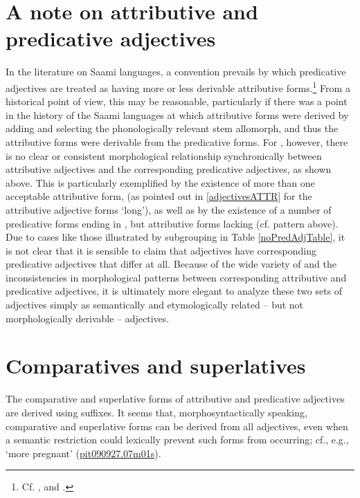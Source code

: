 \section{A note on attributive and predicative adjectives}\label{notePredNounsAdjs}
In the literature on Saami languages, a convention prevails by which predicative adjectives are treated as having more or less derivable attributive forms.\footnote{Cf. \citet[71]{Sammallahti1998}, \citet[74-76;98]{Svonni2009} and \citet[179]{Feist2010}.} 
From a historical point of view, this may be reasonable, particularly if there was a point in the history of the Saami languages at which attributive forms were derived by adding \mbox{} and selecting the phonologically relevant stem allomorph, and thus the attributive forms were derivable from the predicative forms. For \PS, however, there is no clear or consistent morphological relationship synchronically between attributive adjectives and the corresponding predicative adjectives, as shown above. This is particularly exemplified by the existence of more than one acceptable attributive form, (as pointed out in \SEC\ref{adjectivesATTR} for the attributive adjective forms \TILDE{} ‘long’), as well as by the existence of a number of predicative forms ending in , but attributive forms lacking  (cf. pattern  above). 
Due to cases like those illustrated by subgrouping  in Table \ref{noPredAdjTable}, it is not clear that it is sensible to claim that  adjectives have corresponding predicative adjectives that differ at all. 
Because of the wide variety of and the inconsistencies in morphological patterns between corresponding attributive and predicative adjectives, it is ultimately more elegant to analyze these two sets of adjectives simply as semantically and etymologically related – but not morphologically derivable – adjectives. 


\section{Comparatives and superlatives}\label{compSuperlADJs}
The comparative and superlative %
forms of attributive and predicative adjectives are derived using suffixes. It seems that, morphosyntactically speaking, comparative and superlative forms can be derived from all adjectives, even when a semantic restriction could lexically prevent such forms from occurring; cf., e.g.,~ ‘more pregnant’ (\hyperlink{pit090927}{pit090927.07m01s}). 

